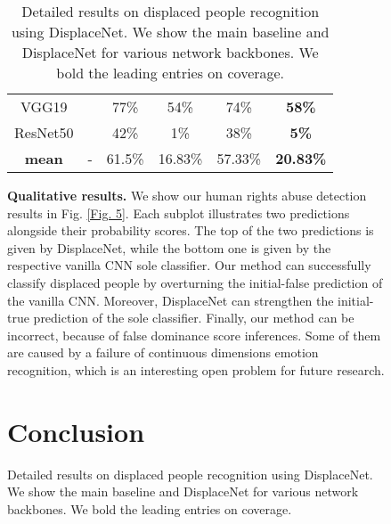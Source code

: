 \documentclass[10pt,twocolumn,letterpaper]{article}
\begin{document}
\begin{figure}[t!]
\begin{table}[t!]
{\begin{tabular}{c|c|cc|cc}
			VGG19                                                                        &                                                                               & 77\%             & 54\%          & 74\%           & \textbf{58\%}         \\
			ResNet50                                                                     &                                                                               & 42\%             & 1\%           & 38\%           & \textbf{5\%}         \\ \hline
			\textbf{mean}                                                                        & -                                                            & 61.5\%             & 16.83\%            & 57.33\%           & \textbf{20.83\%}           \\ \hline
		\end{tabular}
	}
	\caption{\label{tab1}Detailed results on displaced people recognition using DisplaceNet. We show the main baseline and DisplaceNet for various network backbones. We bold the leading entries on coverage.}
\end{table}



\noindent
\textbf{Qualitative results.} We show our human rights abuse detection results in Fig. \ref{Fig. 5}. Each subplot illustrates two predictions alongside their probability scores. The top of the two predictions is given by DisplaceNet, while the bottom one is given by the respective vanilla CNN sole classifier. Our method can successfully classify displaced people by overturning the initial-false prediction of the vanilla CNN. Moreover, DisplaceNet can strengthen the initial-true prediction of the sole classifier. Finally, our method can be incorrect, because of false dominance score inferences. Some of them are caused by a failure of continuous dimensions emotion recognition, which is an interesting open problem for future research.






\section{Conclusion}


\end{figure}
\end{document}
